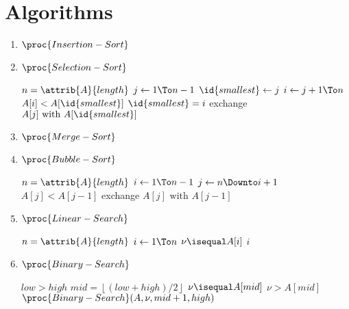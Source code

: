 \documentclass{report}
\newcommand{\floor}[1]{\left\lfloor #1 \right\rfloor}
\begin{document}
\section{Algorithms}
\begin{enumerate}
    \item \hyperref[alg:insertion-sort]{$\proc{Insertion-Sort}$}
    \item $\proc{Selection-Sort}$
    \begin{codebox}
     \label{alg:selection-sort}
    \li $n = \attrib{A}{length}$
    \li \For $j \gets 1 \To n - 1$
        \Do 
    \li     $\id{smallest} \gets j$
    \li     \For $i \gets j + 1 \To n$
            \Do 
    \li         \If $A[i] < A[\id{smallest}]$
                \Then 
    \li             $\id{smallest} = i$
                \End
            \End
    \li     exchange $A[j] \text{ with } A[\id{smallest}]$
        \End
    \end{codebox}
    \item \hyperref[alg:merge-sort]{$\proc{Merge-Sort}$}
    \item $\proc{Bubble-Sort}$ 
    \begin{codebox}
     \label{alg:bubble-sort}
    \li $n = \attrib{A}{length}$
    \li \For $i \gets 1 \To n-1$
        \Do 
    \li     \For $j \gets n \Downto i+1$
            \Do 
    \li         \If $A[j] < A[j-1]$
                \Then 
    \li             exchange $A[j] \text{ with } A[j-1]$
                \End
            \End
        \End
    \end{codebox}
    \item $\proc{Linear-Search}$
    \begin{codebox}
     \label{alg:linear-search}
    \li $n = \attrib{A}{length}$
    \li \For $i \gets 1 \To n$
        \Do 
    \li     \If $\nu \isequal A[i]$
            \Then 
    \li         \Return $i$
            \End
        \End
    \li \Return {}
    \end{codebox}
    \item $\proc{Binary-Search}$
    \begin{codebox}
    \li \If $low > high$
        \Then 
    \li     \Return {}
        \End
    \li $mid = \floor{(low+high)/2}$
    \li \If $\nu \isequal A[mid]$
        \Then 
    \li     \Return {}
    \li \ElseIf $\nu > A[mid]$
        \Then 
    \li     \Return $\proc{Binary-Search}(A, \nu, mid+1, high)$

\end{codebox}
\end{enumerate}
\end{document}
